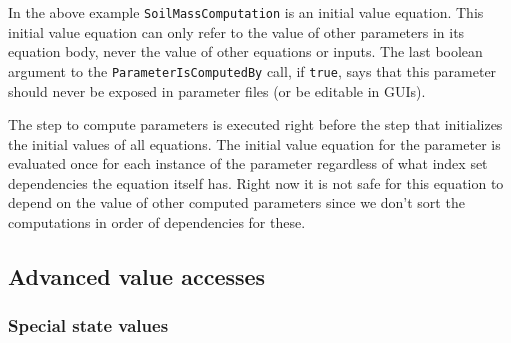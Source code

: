 \documentclass[11pt]{article}
\theoremstyle{definition}
\begin{document}
In the above example {\tt SoilMassComputation} is an initial value equation. This initial value equation can only refer to the value of other parameters in its equation body, never the value of other equations or inputs. The last boolean argument to the {\tt ParameterIsComputedBy} call, if {\tt true}, says that this parameter should never be exposed in parameter files (or be editable in GUIs).

The step to compute parameters is executed right before the step that initializes the initial values of all equations. The initial value equation for the parameter is evaluated once for each instance of the parameter regardless of what index set dependencies the equation itself has. Right now it is not safe for this equation to depend on the value of other computed parameters since we don't sort the computations in order of dependencies for these.

\subsection{Advanced value accesses}\label{sec:advancedaccess}

\subsubsection{Special state values}
\end{document}
